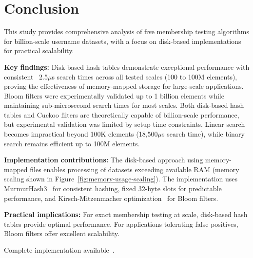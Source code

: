 \documentclass[sigconf]{acmart}
\begin{document}
\section{Conclusion}
This study provides comprehensive analysis of five membership testing algorithms for billion-scale username datasets, with a focus on disk-based implementations for practical scalability.

\textbf{Key findings:} Disk-based hash tables demonstrate exceptional performance with consistent ~2.5$\mu$s search times across all tested scales (100 to 100M elements), proving the effectiveness of memory-mapped storage for large-scale applications. Bloom filters were experimentally validated up to 1 billion elements while maintaining sub-microsecond search times for most scales. Both disk-based hash tables and Cuckoo filters are theoretically capable of billion-scale performance, but experimental validation was limited by setup time constraints. Linear search becomes impractical beyond 100K elements (18,500$\mu$s search time), while binary search remains efficient up to 100M elements.

\textbf{Implementation contributions:} The disk-based approach using memory-mapped files enables processing of datasets exceeding available RAM (memory scaling shown in Figure~\ref{fig:memory-usage-scaling}). The implementation uses MurmurHash3~\cite{mmh3docs} for consistent hashing, fixed 32-byte slots for predictable performance, and Kirsch-Mitzenmacher optimization~\cite{kirsch2008} for Bloom filters.

\textbf{Practical implications:} For exact membership testing at scale, disk-based hash tables provide optimal performance. For applications tolerating false positives, Bloom filters offer excellent scalability.

Complete implementation available~\cite{loginchecker}.
\end{document}
